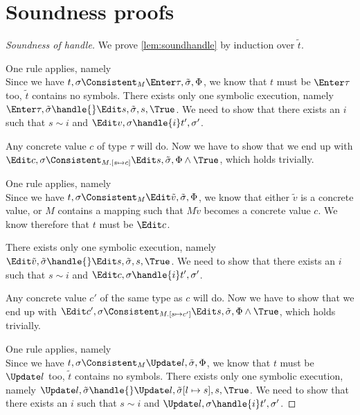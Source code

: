 
\section{Soundness proofs}
\label{sec:soundnessproofs}


\begin{proof}[Soundness of handle]

  We prove \cref{lem:soundhandle} by induction over $\tilde{t}$.

 {One rule applies, namely \\
 Since we have $t,\sigma\Consistent_M\Enter \tau,\tilde{\sigma},\Phi$, we know that $t$ must be $\Enter \tau$ too, $\tilde{t}$ contains no symbols.
 There exists only one symbolic execution, namely $\Enter \tau,\tilde{\sigma}\handle{}\Edit s,\tilde{\sigma},s,\True$.
 We need to show that there exists an $i$ such that $s\sim i$ and $\Edit v,\sigma\handle{i}t',\sigma'$.

 Any concrete value $c$ of type $\tau$ will do. Now we have to show that we end up with $\Edit c,\sigma\Consistent_{M.[s\mapsto c]}\Edit s,\tilde{\sigma},\Phi\land\True$, which holds trivially.
 }

  {One rule applies, namely \\
  Since we have $t,\sigma\Consistent_M\Edit \tilde{v},\tilde{\sigma},\Phi$, we know that either $\tilde{v}$ is a concrete value, or $M$ contains a mapping such that $M\tilde{v}$ becomes a concrete value $c$. We know therefore that $t$ must be $\Edit c$.

  There exists only one symbolic execution, namely $\Edit \tilde{v},\tilde{\sigma}\handle{}\Edit s,\tilde{\sigma},s,\True$.
  We need to show that there exists an $i$ such that $s\sim i$ and $\Edit c,\sigma\handle{i}t',\sigma'$.

  Any concrete value $c'$ of the same type as $c$ will do. Now we have to show that we end up with $\Edit c',\sigma\Consistent_{M.[s\mapsto c']}\Edit s,\tilde{\sigma},\Phi\land\True$, which holds trivially.
  }


{One rule applies, namely \\

Since we have $t,\sigma\Consistent_M\Update l,\tilde{\sigma},\Phi$, we know that $t$ must be $\Update l$ too, $\tilde{t}$ contains no symbols.
There exists only one symbolic execution, namely $\Update l,\tilde{\sigma}\handle{}\Update l,\tilde{\sigma}[l\mapsto s],s,\True$.
We need to show that there exists an $i$ such that $s\sim i$ and $\Update l,\sigma\handle{i}t',\sigma'$.

}
\end{proof}
